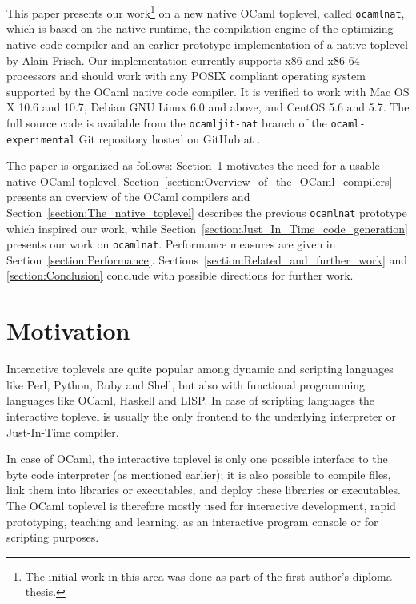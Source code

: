 \documentclass[10pt,a4paper,draft,twocolumn]{article}
\begin{document}
This paper presents our work\footnote{The initial work in this area was done as part of the first
author's diploma thesis.} on a new native OCaml toplevel, called \texttt{ocamlnat}, which is
based on the native runtime, the compilation engine of the optimizing native code compiler and
an earlier prototype implementation of a native toplevel by Alain Frisch. Our implementation
currently supports x86 and x86-64 processors \cite{Amd09Vol1,Intel10Vol1} and should work with any
POSIX compliant operating system supported by the OCaml native code compiler. It is verified to
work with Mac OS X 10.6 and 10.7, Debian GNU Linux 6.0 and above, and CentOS 5.6 and 5.7. The
full source code is available from the \texttt{ocamljit-nat} branch of the \texttt{ocaml-experimental}
Git repository hosted on GitHub at \cite{Meurer11ocamlexperimental}.

The paper is organized as follows: Section~\ref{section:Motivation} motivates the need for a
usable native OCaml toplevel. Section~\ref{section:Overview_of_the_OCaml_compilers} presents
an overview of the OCaml compilers and Section~\ref{section:The_native_toplevel} describes the
previous \texttt{ocamlnat} prototype which inspired our work, while
Section~\ref{section:Just_In_Time_code_generation} presents our work on \texttt{ocamlnat}.
Performance measures are given in Section~\ref{section:Performance}.
Sections~\ref{section:Related_and_further_work} and \ref{section:Conclusion} conclude with
possible directions for further work.


\section{Motivation} \label{section:Motivation}

Interactive toplevels are quite popular among dynamic and scripting languages like Perl, Python, Ruby
and Shell, but also with functional programming languages like OCaml, Haskell and LISP. In case of
scripting languages the interactive toplevel is usually the only frontend to the underlying interpreter
or Just-In-Time compiler.

In case of OCaml, the interactive toplevel is only one possible interface to the byte code interpreter
(as mentioned earlier); it is also possible to compile files, link them into libraries or executables,
and deploy these libraries or executables. The OCaml toplevel is therefore mostly used for
interactive development, rapid prototyping, teaching and learning, as an interactive program console
or for scripting purposes.
\end{document}
